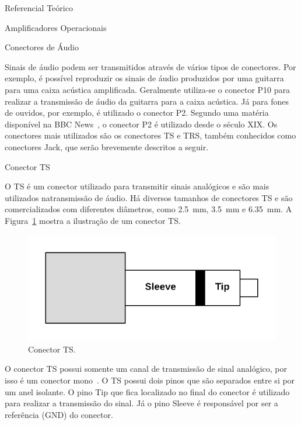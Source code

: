 \begin{chapter}{Referencial Teórico}
\begin{section}{Amplificadores Operacionais}
\end{section}


\begin{section}{Conectores de Áudio}

Sinais de áudio podem ser transmitidos através de vários tipos de conectores.
Por exemplo, é possível reproduzir os sinais de áudio produzidos por uma
guitarra para uma caixa acústica amplificada. Geralmente utiliza-se o conector
P10 para realizar a transmissão de áudio da guitarra para a caixa acústica. Já
para fones de ouvidos, por exemplo, é utilizado o conector P2. Segundo uma
matéria disponível na BBC News~\cite{BBC}, o conector P2 é utilizado desde o
século XIX.  Os conectores mais utilizados são os conectores TS e TRS, também
conhecidos como conectores Jack, que serão brevemente descritos a seguir.

\begin{subsection}{Conector TS}

O TS é um conector utilizado para transmitir sinais analógicos e são mais
utilizados natransmissão de áudio. Há diversos tamanhos de conectores TS e são
comercializados com diferentes diâmetros, como 2.5~mm, 3.5~mm e 6.35~mm. A
Figura~\ref{fig:TS} mostra a ilustração de um conector TS.

\begin{figure}[!h]
	\centering
	\begin{minipage}[c]{\textwidth}
	\centering
	\includegraphics[width=0.9\linewidth]{fig/ts}
	\caption{Conector TS.}
	\label{fig:TS}
	\end{minipage}
\end{figure} 

O conector TS possui somente um canal de transmissão de sinal analógico,
por isso é um conector mono~\cite{ts}. O TS possui dois pinos
que são separados entre si por um anel isolante. O pino Tip que  fica localizado
no final do conector é utilizado para realizar a  transmissão do sinal. Já o
pino Sleeve é responsável por ser a referência (GND) do conector.


\end{subsection}
\end{section}
\end{chapter}
